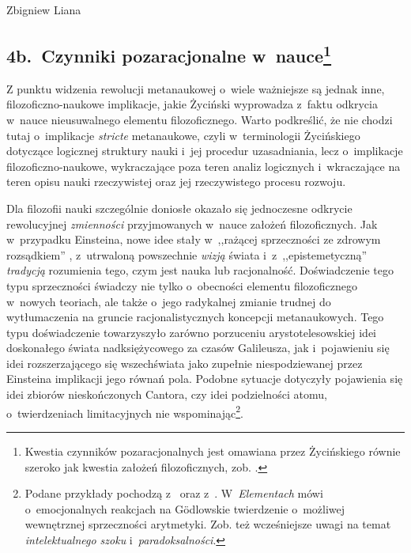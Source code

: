 \begin{artplenv}{Zbigniew Liana}
\subsection{4b.~Czynniki pozaracjonalne w~nauce\footnote{Kwestia czynników pozaracjonalnych jest omawiana przez Życińskiego równie
szeroko jak kwestia założeń filozoficznych, zob.
\parencites[s.~127–154]{zycinski_jezyk_1983}[s.~156–166]{zycinski_teizm_1985}[rozdz. 5]%
{zycinski_structure_1988}[rozdz. 5]{zycinski_struktura_2013}%
[rozdz. 7]{zycinski_elementy_1996}.
	}
}

Z punktu widzenia rewolucji metanaukowej o~wiele ważniejsze są jednak inne, filozoficzno-naukowe implikacje, jakie
Życiński wyprowadza z~faktu odkrycia w~nauce nieusuwalnego elementu filozoficznego. Warto podkreślić, że nie chodzi
tutaj o~implikacje \textit{stricte} metanaukowe, czyli w~terminologii Życińskiego dotyczące logicznej struktury nauki i~jej
procedur uzasadniania, lecz o~implikacje filozoficzno-naukowe, wykraczające poza teren analiz
logicznych i~wkraczające na teren opisu nauki rzeczywistej oraz jej rzeczywistego procesu rozwoju. 

Dla filozofii nauki szczególnie doniosłe okazało się jednoczesne odkrycie rewolucyjnej \textit{zmienności} przyjmowanych w~nauce
założeń filozoficznych. Jak w~przypadku Einsteina, nowe idee stały w~,,rażącej sprzeczności ze zdrowym rozsądkiem''
\parencite[s.~249]{zycinski_jezyk_1983},
z~utrwaloną powszechnie \textit{wizją} świata
\parencite[s.~229]{zycinski_elementy_1996}
i~z~,,epistemetyczną'' \textit{tradycją} rozumienia tego,
czym jest nauka lub racjonalność.  Doświadczenie tego typu sprzeczności świadczy nie tylko o~obecności elementu
filozoficznego w~nowych teoriach, ale także o~jego radykalnej zmianie trudnej do wytłumaczenia na gruncie
racjonalistycznych koncepcji metanaukowych. Tego typu doświadczenie towarzyszyło zarówno porzuceniu arystotelesowskiej
idei doskonałego świata nadksiężycowego za czasów Galileusza, jak i~pojawieniu się idei rozszerzającego się
wszechświata jako zupełnie niespodziewanej przez Einsteina implikacji jego równań pola. Podobne sytuacje dotyczyły
pojawienia się idei zbiorów nieskończonych Cantora, czy idei podzielności atomu, o~twierdzeniach limitacyjnych nie
wspominając\footnote{Podane przykłady pochodzą
z~\parencite[s.~187]{zycinski_jezyk_1983}
oraz
z~\parencite[s.~247]{zycinski_elementy_1996}.
W~\textit{Elementach}
\parencite[s.~267n]{zycinski_elementy_1996}
mówi o~emocjonalnych reakcjach na Gödlowskie twierdzenie o~możliwej
wewnętrznej sprzeczności arytmetyki. Zob. też wcześniejsze uwagi na temat \textit{intelektualnego szoku} i~\textit{paradoksalności}.}.


\end{artplenv}
